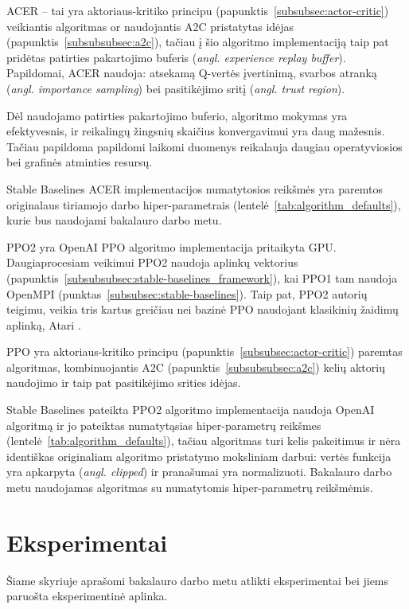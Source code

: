 \documentclass{VUMIFPSbakalaurinis}
\begin{document}
\label{subsubsubsec:acer}
{
	ACER \cite{acer} -- tai yra aktoriaus-kritiko principu (papunktis~\ref{subsubsec:actor-critic}) veikiantis algoritmas or naudojantis A2C pristatytas idėjas (papunktis~\ref{subsubsubsec:a2c}), tačiau į šio algoritmo implementaciją taip pat pridėtas patirties pakartojimo buferis (\textit{angl. experience replay buffer}). Papildomai, ACER naudoja: atsekamą Q-vertės įvertinimą, svarbos atranką (\textit{angl. importance sampling}) bei pasitikėjimo sritį (\textit{angl. trust region}).\par
	
	Dėl naudojamo patirties pakartojimo buferio, algoritmo mokymas yra efektyvesnis, ir reikalingų žingsnių skaičius konvergavimui yra daug mažesnis. Tačiau papildoma papildomi laikomi duomenys reikalauja daugiau operatyviosios bei grafinės atminties resursų.\par
	
	Stable Baselines ACER implementacijos numatytosios reikšmės yra paremtos originalaus tiriamojo darbo hiper-parametrais (lentelė~\ref{tab:algorithm_defaults}), kurie bus naudojami bakalauro darbo metu.
}
\label{subsubsubsec:ppo2}
{
	PPO2 yra OpenAI \cite{baselines} PPO algoritmo \cite{ppo} implementacija pritaikyta GPU. Daugiaprocesiam veikimui PPO2 naudoja aplinkų vektorius (papunktis~\ref{subsubsubsec:stable-baselines_framework}), kai PPO1 tam naudoja OpenMPI (punktas~\ref{subsubsec:stable-baselines}). Taip pat, PPO2 autorių teigimu, veikia tris kartus greičiau nei bazinė PPO naudojant klasikinių žaidimų aplinką, Atari \cite{schulman_2019}.\par
	PPO yra aktoriaus-kritiko principu (papunktis~\ref{subsubsec:actor-critic}) paremtas algoritmas, kombinuojantis A2C (papunktis~\ref{subsubsubsec:a2c}) kelių aktorių naudojimo ir taip pat pasitikėjimo srities idėjas.\par
	
	Stable Baselines pateikta PPO2 algoritmo implementacija naudoja OpenAI algoritmą ir jo pateiktas numatytąsias hiper-parametrų reikšmes (lentelė~\ref{tab:algorithm_defaults}), tačiau algoritmas turi kelis pakeitimus ir nėra identiškas originaliam algoritmo pristatymo moksliniam darbui: vertės funkcija yra apkarpyta (\textit{angl. clipped}) ir pranašumai yra normalizuoti. Bakalauro darbo metu naudojamas algoritmas su numatytomis hiper-parametrų reikšmėmis.  
}
\section{Eksperimentai}
{
	Šiame skyriuje aprašomi bakalauro darbo metu atlikti eksperimentai bei jiems paruošta eksperimentinė aplinka.
}
\end{document}
